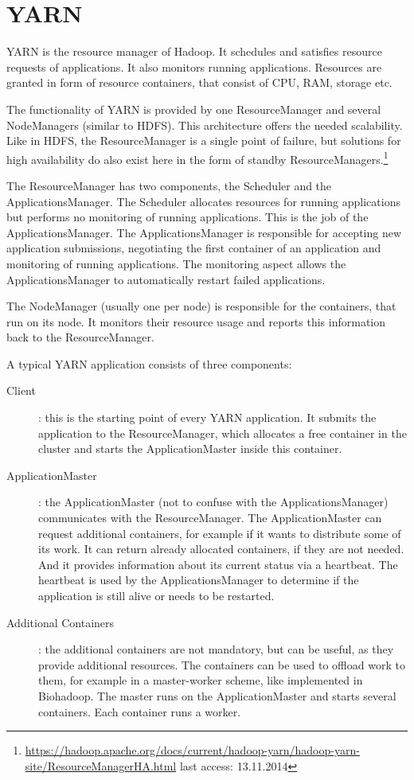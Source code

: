 \section{YARN}
\label{chap:hadoop:yarn}
YARN is the resource manager of Hadoop. It schedules and satisfies resource requests of applications. It also monitors running applications. Resources are granted in form of resource containers, that consist of CPU, RAM, storage etc.

The functionality of YARN is provided by one ResourceManager and several NodeManagers (similar to HDFS). This architecture offers the needed scalability. Like in HDFS, the ResourceManager is a single point of failure, but solutions for high availability do also exist here in the form of standby ResourceManagers.\footnote{\url{https://hadoop.apache.org/docs/current/hadoop-yarn/hadoop-yarn-site/ResourceManagerHA.html} last access: 13.11.2014}

The ResourceManager has two components, the Scheduler and the ApplicationsManager. The Scheduler allocates resources for running applications but performs no monitoring of running applications. This is the job of the ApplicationsManager. The ApplicationsManager is responsible for accepting new application submissions, negotiating the first container of an application and monitoring of running applications. The monitoring aspect allows the ApplicationsManager to automatically restart failed applications.

The NodeManager (usually one per node) is responsible for the containers, that run on its node. It monitors their resource usage and reports this information back to the ResourceManager.

A typical YARN application consists of three components:

\begin{description}
  \item[Client]: this is the starting point of every YARN application. It submits the application to the ResourceManager, which allocates a free container in the cluster and starts the ApplicationMaster inside this container.
  \item[ApplicationMaster]: the ApplicationMaster (not to confuse with the ApplicationsManager) communicates with the ResourceManager. The ApplicationMaster can request additional containers, for example if it wants to distribute some of its work. It can return already allocated containers, if they are not needed. And it provides information about its current status via a heartbeat. The heartbeat is used by the ApplicationsManager to determine if the application is still alive or needs to be restarted.
  \item[Additional Containers]: the additional containers are not mandatory, but can be useful, as they provide additional resources. The containers can be used to offload work to them, for example in a master-worker scheme, like implemented in Biohadoop. The master runs on the ApplicationMaster and starts several containers. Each container runs a worker.
\end{description}

